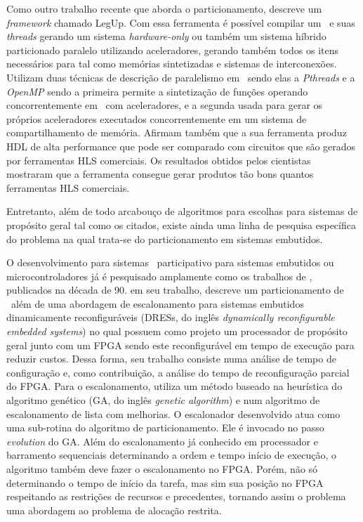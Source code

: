    Como outro trabalho recente que aborda o particionamento, \cite{Choi2016} descreve um \textit{framework} chamado LegUp.
   Com essa ferramenta é possível compilar um \software\ e suas \textit{threads} gerando um sistema \textit{hardware-only} ou também um sistema híbrido particionado paralelo utilizando aceleradores, gerando também todos os itens necessários para tal como memórias sintetizadas e sistemas de interconexões.
   Utilizam duas técnicas de descrição de paralelismo em \software\ sendo elas a \textit{Pthreads} e a \textit{OpenMP} sendo a primeira permite a sintetização de funções operando concorrentemente em \hardware\ com aceleradores, e a segunda usada para gerar os próprios aceleradores executados concorrentemente em um sistema de compartilhamento de memória.
   Afirmam também que a sua ferramenta produz HDL de alta performance que pode ser comparado com circuitos que são gerados por ferramentas HLS comerciais. 
   Os resultados obtidos pelos cientistas \cite{Canis2011} mostraram que a ferramenta consegue gerar produtos tão bons quantos ferramentas HLS comerciais.
   
   Entretanto, além de todo arcabouço de algoritmos para escolhas para sistemas de propósito geral tal como os citados, existe ainda uma linha de pesquisa específica do problema na qual trata-se do particionamento em sistemas embutidos.
   
   
   O desenvolvimento para sistemas \hs\ participativo para sistemas embutidos ou microcontroladores já é pesquisado amplamente como os trabalhos de \citeauthor{Ernst1993, Gupta1995, Hardt1995, Gajski1994, Bolsens1997}, publicados na década de 90.
   \citet{Mei2000} em seu trabalho, descreve um particionamento de \hs\ além de uma abordagem de escalonamento para sistemas embutidos dinamicamente reconfiguráveis (DRESs, do inglês \textit{dynamically reconfigurable embedded systems}) no qual possuem como projeto um processador de propósito geral junto com um FPGA sendo este reconfigurável em tempo de execução para reduzir custos.
   Dessa forma, seu trabalho consiste numa análise de tempo de configuração e, como contribuição, a análise do tempo de reconfiguração parcial do FPGA.
   Para o escalonamento, \citeauthor{Mei2000} utiliza um método baseado na heurística do algoritmo genético (GA, do inglês \textit{genetic algorithm}) e num algoritmo de escalonamento de lista com melhorias.
   O escalonador desenvolvido atua como uma sub-rotina do algoritmo de particionamento. 
   Ele é invocado no passo \textit{evolution} do GA. 
   Além do escalonamento já conhecido em processador e barramento sequenciais determinando a ordem e tempo início de execução, o algoritmo também deve fazer o escalonamento no FPGA.
   Porém, não só determinando o tempo de início da tarefa, mas sim sua posição no FPGA respeitando as restrições de recursos e precedentes, tornando assim o problema uma abordagem ao problema de alocação restrita.
   
